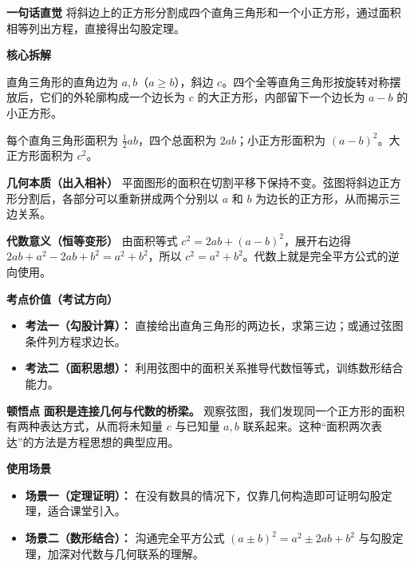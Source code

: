 \begin{explanationbox}
	\textbf{\textcolor{CExplanation}{一句话直觉}}
	将斜边上的正方形分割成四个直角三角形和一个小正方形，通过面积相等列出方程，直接得出勾股定理。

	\medskip
	\textbf{\textcolor{CExplanation}{核心拆解}}
	\begin{description}[style=nextline, leftmargin=2.8em, labelsep=0.5em, itemsep=0.45em]
		\item[\textbf{要点一（图形构成）：}]
			直角三角形的直角边为 $a,b$（$a\ge b$），斜边 $c$。四个全等直角三角形按旋转对称摆放后，它们的外轮廓构成一个边长为 $c$ 的大正方形，内部留下一个边长为 $a-b$ 的小正方形。
		\item[\textbf{要点二（面积关系）：}]
			每个直角三角形面积为 $\frac12 ab$，四个总面积为 $2ab$；小正方形面积为 $(a-b)^2$。大正方形面积为 $c^2$。
	\end{description}

	\medskip
	\textbf{\textcolor{CExplanation}{几何本质（出入相补）}}
	平面图形的面积在切割平移下保持不变。弦图将斜边正方形分割后，各部分可以重新拼成两个分别以 $a$ 和 $b$ 为边长的正方形，从而揭示三边关系。

	\medskip
	\textbf{\textcolor{CExplanation}{代数意义（恒等变形）}}
	由面积等式 $c^2 = 2ab + (a-b)^2$，展开右边得 $2ab + a^2 -2ab + b^2 = a^2 + b^2$，所以 $c^2 = a^2+b^2$。代数上就是完全平方公式的逆向使用。

	\medskip
	\textbf{\textcolor{CExplanation}{考点价值（考试方向）}}
	\begin{itemize}[leftmargin=*, itemsep=0.5em, topsep=0.4em]
		\item \textbf{考法一（勾股计算）：} 直接给出直角三角形的两边长，求第三边；或通过弦图条件列方程求边长。
		\item \textbf{考法二（面积思想）：} 利用弦图中的面积关系推导代数恒等式，训练数形结合能力。
	\end{itemize}

	\medskip
	\textbf{\textcolor{CExplanation}{顿悟点}}
	\textbf{面积是连接几何与代数的桥梁。} 观察弦图，我们发现同一个正方形的面积有两种表达方式，从而将未知量 $c$ 与已知量 $a,b$ 联系起来。这种“面积两次表达”的方法是方程思想的典型应用。

	\medskip
	\textbf{\textcolor{CExplanation}{使用场景}}
	\begin{itemize}[leftmargin=*, itemsep=0.5em, topsep=0.4em]
		\item \textbf{场景一（定理证明）：} 在没有数具的情况下，仅靠几何构造即可证明勾股定理，适合课堂引入。
		\item \textbf{场景二（数形结合）：} 沟通完全平方公式 $(a\pm b)^2 = a^2 \pm 2ab + b^2$ 与勾股定理，加深对代数与几何联系的理解。
	\end{itemize}

\end{explanationbox}
